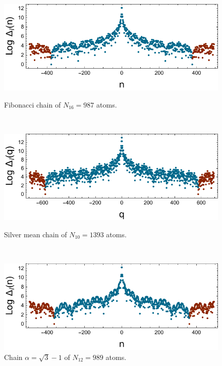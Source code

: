 \documentclass[a4paper]{jpconf}
\begin{document}
\begin{figure}[htp]
	\centering
	\begin{minipage}{0.3\textwidth}
		\centering
		\includegraphics[width=1.\textwidth]{img/loggapwidth_Fibonacci_l_16.pdf}
		\caption{\small{Fibonacci chain of $N_{16} = 987$ atoms.}}
		\label{fig:width1}
	\end{minipage}~~
	\begin{minipage}{0.3\textwidth}
		\centering
		\includegraphics[width=1.\textwidth]{img/loggapwidth_Silver_l_10.pdf}
		\caption{\small{Silver mean chain of $N_{10} = 1393$ atoms.}}
		\label{fig:width2}
	\end{minipage}~~
	\begin{minipage}{0.3\textwidth}
		\centering
		\includegraphics[width=1.\textwidth]{img/loggapwidth_sqrt3_l_12.pdf}
		\caption{\small{Chain $\alpha = \sqrt{3}-1$ of $N_{12} = 989$ atoms.}}
		\label{fig:width3}
	\end{minipage}
\end{figure}
\end{document}
